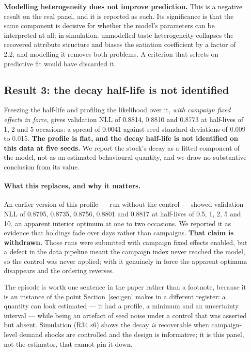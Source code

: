 \documentclass[11pt]{article}
\begin{document}
\textbf{Modelling heterogeneity does not improve prediction.} This is a negative
result on the real panel, and it is reported as such. Its significance is that
the same component is decisive for whether the model's parameters can be
interpreted at all: in simulation, unmodelled taste heterogeneity collapses the
recovered attribute structure and biases the satiation coefficient by a factor
of 2.2, and modelling it removes both problems. A criterion that selects on
predictive fit would have discarded it.

\subsection*{Result 3: the decay half-life is not identified}

Freezing the half-life and profiling the likelihood over it, \emph{with campaign
fixed effects in force}, gives validation NLL of 0.8814, 0.8810 and 0.8773 at
half-lives of 1, 2 and 5 occasions: a spread of 0.0041 against seed standard
deviations of 0.009 to 0.015. \textbf{The profile is flat, and the decay
half-life is not identified on this data at five seeds.} We report the stock's
decay as a fitted component of the model, not as an estimated behavioural
quantity, and we draw no substantive conclusion from its value.

\paragraph{What this replaces, and why it matters.} An earlier version of this
profile --- run without the control --- showed validation NLL of 0.8795,
0.8735, 0.8756, 0.8801 and 0.8817 at half-lives of 0.5, 1, 2, 5 and 10, an
apparent interior optimum at one to two occasions. We reported it as evidence
that holdings fade over days rather than campaigns. \textbf{That claim is
withdrawn.} Those runs were submitted with campaign fixed effects enabled, but a
defect in the data pipeline meant the campaign index never reached the model, so
the control was never applied; with it genuinely in force the apparent optimum
disappears and the ordering reverses.

The episode is worth one sentence in the paper rather than a footnote, because
it is an instance of the point Section~\ref{sec:gen} makes in a different
register: a quantity can look estimated --- it had a profile, a minimum and an
uncertainty interval --- while being an artefact of seed noise under a control
that was asserted but absent. Simulation (R34 s6) shows the decay \emph{is}
recoverable when campaign-level demand shocks are controlled and the design is
informative; it is this panel, not the estimator, that cannot pin it down.
\end{document}
